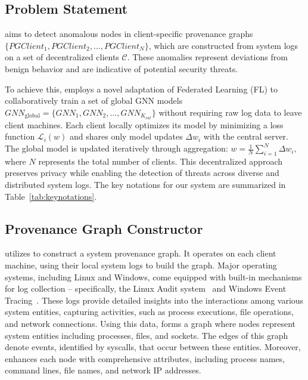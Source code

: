 \subsection{Problem Statement}

\Sys aims to detect anomalous nodes in client-specific provenance graphs \( \{PGClient_{1}, PGClient_{2}, \ldots, PGClient_{N}\} \), which are constructed from system logs on a set of decentralized clients \( \mathcal{C} \). These anomalies represent deviations from benign behavior and are indicative of potential security threats.

To achieve this, \Sys employs a novel adaptation of Federated Learning (FL) to collaboratively train a set of global GNN models \( {GNN}_{\text{global}} = \{GNN_1, GNN_2, \ldots, GNN_{K_{cat}}\} \) without requiring raw log data to leave client machines. Each client locally optimizes its model by minimizing a loss function \( \mathcal{L}_i(w) \) and shares only model updates \( \Delta w_i \) with the central server. The global model is updated iteratively through aggregation: \( w = \frac{1}{N} \sum_{i=1}^{N} \Delta w_i, \)
where \( N \) represents the total number of clients. This decentralized approach preserves privacy while enabling the detection of threats across diverse and distributed system logs. The key notations for our system are summarized in Table~\ref{tab:keynotations}.



\subsection{Provenance Graph Constructor}
\label{sub:provconstruct}

\Sys utilizes \logs to construct a system provenance graph. It operates on each client machine, using their local system logs to build the graph. Major operating systems, including Linux and Windows, come equipped with built-in mechanisms for log collection -- specifically, the Linux Audit system~\cite{linuxaudit} and Windows Event Tracing~\cite{windowsaudit}. These logs provide detailed insights into the interactions among various system entities, capturing activities, such as process executions, file operations, and network connections. Using this data, \Sys forms a graph where nodes represent system entities including processes, files, and sockets. The edges of this graph denote events, identified by syscalls, that occur between these entities. Moreover, \Sys enhances each node with comprehensive attributes, including process names, command lines, file names, and network IP addresses.

